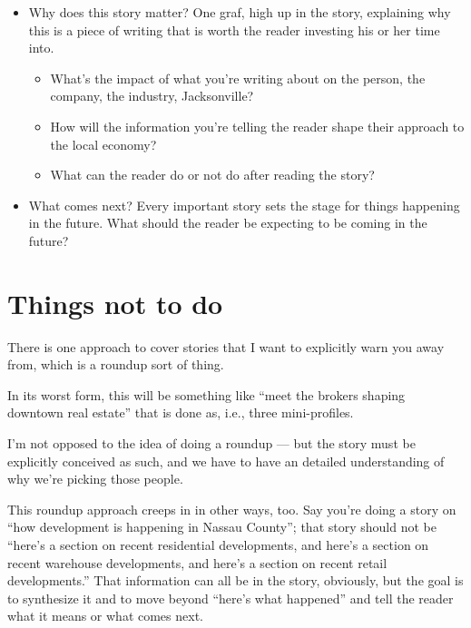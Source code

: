 \documentclass[
  11pt,
  american,
  letterpaperpaper,
  extrafontsizes,onecolumn,openright
  ]{memoir}
\providecommand{\tightlist}{%
  \setlength{\itemsep}{0pt}\setlength{\parskip}{0pt}}
\begin{document}
\begin{itemize}
\tightlist
\item
  Why does this story matter? One graf, high up in the story, explaining why this is a piece of writing that is worth the reader investing his or her time into.

  \begin{itemize}
  \tightlist
  \item
    What's the impact of what you're writing about on the person, the company, the industry, Jacksonville?
  \item
    How will the information you're telling the reader shape their approach to the local economy?
  \item
    What can the reader do or not do after reading the story?
  \end{itemize}
\item
  What comes next? Every important story sets the stage for things happening in the future. What should the reader be expecting to be coming in the future?
\end{itemize}

\hypertarget{things-not-to-do}{%
\section*{Things not to do}\label{things-not-to-do}}

There is one approach to cover stories that I want to explicitly warn you away from, which is a roundup sort of thing.

In its worst form, this will be something like \enquote{meet the brokers shaping downtown real estate} that is done as, i.e., three mini-profiles.

I'm not opposed to the idea of doing a roundup --- but the story must be explicitly conceived as such, and we have to have an detailed understanding of why we're picking those people.

This roundup approach creeps in in other ways, too. Say you're doing a story on \enquote{how development is happening in Nassau County}; that story should not be \enquote{here's a section on recent residential developments, and here's a section on recent warehouse developments, and here's a section on recent retail developments.} That information can all be in the story, obviously, but the goal is to synthesize it and to move beyond \enquote{here's what happened} and tell the reader what it means or what comes next.
\end{document}

